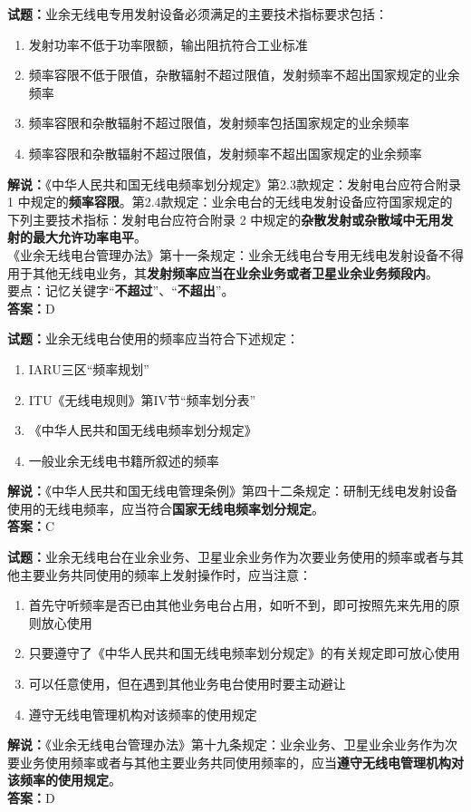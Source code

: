 \documentclass{ctexbook}
\begin{document}
\bigskip




\noindent\textbf{试题：}业余无线电专用发射设备必须满足的主要技术指标要求包括：
\begin{enumerate}[leftmargin=3em]
\item 发射功率不低于功率限额，输出阻抗符合工业标准
\item 频率容限不低于限值，杂散辐射不超过限值，发射频率不超出国家规定的业余频率
\item 频率容限和杂散辐射不超过限值，发射频率包括国家规定的业余频率
\item 频率容限和杂散辐射不超过限值，发射频率不超出国家规定的业余频率
\end{enumerate}
\noindent\textbf{解说：}《中华人民共和国无线电频率划分规定》第2.3款规定：发射电台应符合附录 1 中规定的\textbf{频率容限}。第2.4款规定：业余电台的无线电发射设备应符国家规定的下列主要技术指标：发射电台应符合附录 2 中规定的\textbf{杂散发射或杂散域中无用发射的最大允许功率电平}。\\《业余无线电台管理办法》第十一条规定：业余无线电台专用无线电发射设备不得用于其他无线电业务，其\textbf{发射频率应当在业余业务或者卫星业余业务频段内}。\\要点：记忆关键字“\textbf{不超过}”、“\textbf{不超出}”。\\\noindent\textbf{答案：}D

\bigskip




\noindent\textbf{试题：}业余无线电台使用的频率应当符合下述规定：
\begin{enumerate}[leftmargin=3em]
\item IARU三区“频率规划”
\item ITU《无线电规则》第IV节“频率划分表”
\item 《中华人民共和国无线电频率划分规定》
\item 一般业余无线电书籍所叙述的频率
\end{enumerate}
\noindent\textbf{解说：}《中华人民共和国无线电管理条例》第四十二条规定：研制无线电发射设备使用的无线电频率，应当符合\textbf{国家无线电频率划分规定}。\\\noindent\textbf{答案：}C

\bigskip




\noindent\textbf{试题：}业余无线电台在业余业务、卫星业余业务作为次要业务使用的频率或者与其他主要业务共同使用的频率上发射操作时，应当注意：
\begin{enumerate}[leftmargin=3em]
\item 首先守听频率是否已由其他业务电台占用，如听不到，即可按照先来先用的原则放心使用
\item 只要遵守了《中华人民共和国无线电频率划分规定》的有关规定即可放心使用
\item 可以任意使用，但在遇到其他业务电台使用时要主动避让
\item 遵守无线电管理机构对该频率的使用规定
\end{enumerate}
\noindent\textbf{解说：}《业余无线电台管理办法》第十九条规定：业余业务、卫星业余业务作为次要业务使用频率或者与其他主要业务共同使用频率的，应当\textbf{遵守无线电管理机构对该频率的使用规定}。\\\noindent\textbf{答案：}D
\end{document}
